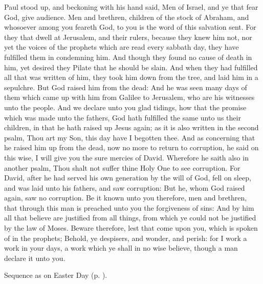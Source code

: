  Paul stood up, and beckoning with his hand said, Men of Israel, and ye that fear God, give audience. Men and brethren, children of the stock of Abraham, and whosoever among you feareth God, to you is the word of this salvation sent. For they that dwell at Jerusalem, and their rulers, because they knew him not, nor yet the voices of the prophets which are read every sabbath day, they have fulfilled them in condemning him. And though they found no cause of death in him, yet desired they Pilate that he should be slain. And when they had fulfilled all that was written of him, they took him down from the tree, and laid him in a sepulchre. But God raised him from the dead: And he was seen many days of them which came up with him from Galilee to Jerusalem, who are his witnesses unto the people. And we declare unto you glad tidings, how that the promise which was made unto the fathers, God hath fulfilled the same unto us their children, in that he hath raised up Jesus again; as it is also written in the second psalm, Thou art my Son, this day have I begotten thee. And as concerning that he raised him up from the dead, now no more to return to corruption, he said on this wise, I will give you the sure mercies of David. Wherefore he saith also in another psalm, Thou shalt not suffer thine Holy One to see corruption. For David, after he had served his own generation by the will of God, fell on sleep, and was laid unto his fathers, and saw corruption: But he, whom God raised again, saw no corruption. Be it known unto you therefore, men and brethren, that through this man is preached unto you the forgiveness of sins: And by him all that believe are justified from all things, from which ye could not be justified by the law of Moses. Beware therefore, lest that come upon you, which is spoken of in the prophets; Behold, ye despisers, and wonder, and perish: for I work a work in your days, a work which ye shall in no wise believe, though a man declare it unto you.

\begin{rubric}
    Sequence as on Easter Day (p. \pageref{PaschalSequence}).
\end{rubric}

